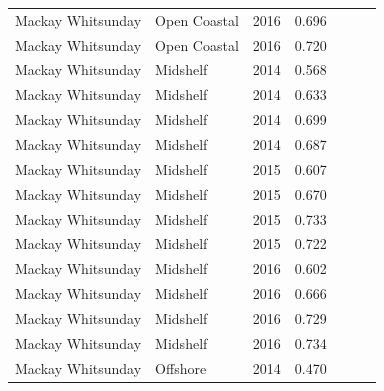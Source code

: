 \begin{longtable}{llccccc}
  Mackay Whitsunday & Open Coastal & 2016 & 0.696 & \cellcolor[HTML]{B0D235}{B} & \cellcolor[HTML]{B0D235}{B} & \cellcolor[HTML]{B0D235}{B} \\ 
  Mackay Whitsunday & Open Coastal & 2016 & 0.720 & \cellcolor[HTML]{B0D235}{B} & \cellcolor[HTML]{B0D235}{B} & \cellcolor[HTML]{B0D235}{B} \\ 
  Mackay Whitsunday & Midshelf & 2014 & 0.568 & \cellcolor[HTML]{F0C918}{C} & \cellcolor[HTML]{F0C918}{C} & \cellcolor[HTML]{F0C918}{C} \\ 
  Mackay Whitsunday & Midshelf & 2014 & 0.633 & \cellcolor[HTML]{F0C918}{C} & \cellcolor[HTML]{B0D235}{B} & \cellcolor[HTML]{F0C918}{C} \\ 
  Mackay Whitsunday & Midshelf & 2014 & 0.699 & \cellcolor[HTML]{B0D235}{B} & \cellcolor[HTML]{B0D235}{B} & \cellcolor[HTML]{B0D235}{B} \\ 
  Mackay Whitsunday & Midshelf & 2014 & 0.687 & \cellcolor[HTML]{B0D235}{B} & \cellcolor[HTML]{B0D235}{B} & \cellcolor[HTML]{B0D235}{B} \\ 
  Mackay Whitsunday & Midshelf & 2015 & 0.607 & \cellcolor[HTML]{F0C918}{C} & \cellcolor[HTML]{B0D235}{B} & \cellcolor[HTML]{F0C918}{C} \\ 
  Mackay Whitsunday & Midshelf & 2015 & 0.670 & \cellcolor[HTML]{B0D235}{B} & \cellcolor[HTML]{B0D235}{B} & \cellcolor[HTML]{B0D235}{B} \\ 
  Mackay Whitsunday & Midshelf & 2015 & 0.733 & \cellcolor[HTML]{B0D235}{B} & \cellcolor[HTML]{B0D235}{B} & \cellcolor[HTML]{B0D235}{B} \\ 
  Mackay Whitsunday & Midshelf & 2015 & 0.722 & \cellcolor[HTML]{B0D235}{B} & \cellcolor[HTML]{B0D235}{B} & \cellcolor[HTML]{B0D235}{B} \\ 
  Mackay Whitsunday & Midshelf & 2016 & 0.602 & \cellcolor[HTML]{F0C918}{C} & \cellcolor[HTML]{B0D235}{B} & \cellcolor[HTML]{F0C918}{C} \\ 
  Mackay Whitsunday & Midshelf & 2016 & 0.666 & \cellcolor[HTML]{F0C918}{C} & \cellcolor[HTML]{B0D235}{B} & \cellcolor[HTML]{B0D235}{B} \\ 
  Mackay Whitsunday & Midshelf & 2016 & 0.729 & \cellcolor[HTML]{B0D235}{B} & \cellcolor[HTML]{B0D235}{B} & \cellcolor[HTML]{B0D235}{B} \\ 
  Mackay Whitsunday & Midshelf & 2016 & 0.734 & \cellcolor[HTML]{B0D235}{B} & \cellcolor[HTML]{B0D235}{B} & \cellcolor[HTML]{B0D235}{B} \\ 
  Mackay Whitsunday & Offshore & 2014 & 0.470 & \cellcolor[HTML]{F47721}{D} & \cellcolor[HTML]{F0C918}{C} & \cellcolor[HTML]{F47721}{D} \\ 

\end{longtable}
